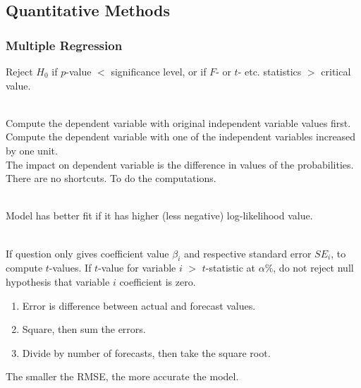 \subsection{Quantitative Methods}

\subsubsection{Multiple Regression}

Reject $H_0$ if $p$-value $<$ significance level, or if $F$- or $t$- etc. statistics $>$ critical value.

\begin{method} \\
Compute the dependent variable with original independent variable values first.\\
Compute the dependent variable with one of the independent variables increased by one unit.\\
The impact on dependent variable is the difference in values of the probabilities.\\
There are no shortcuts. To do the computations.
\end{method}

\begin{method} \\
Model has better fit if it has higher (less negative) log-likelihood value.
\end{method}

\begin{method} \\
If question only gives coefficient value $\beta_i$ and respective standard error $SE_i$, to compute $t$-values. If $t$-value for variable $i$ $>$ $t$-statistic at $\alpha \%$, do not reject null hypothesis that variable $i$ coefficient is zero.
\end{method}

\begin{method} 
\begin{enumerate}[label=\roman*.]
\setlength{\itemsep}{0pt}
\item Error is difference between actual and forecast values.
\item Square, then sum the errors.
\item Divide by number of forecasts, then take the square root.
\end{enumerate}
The smaller the RMSE, the more accurate the model.
\end{method}

